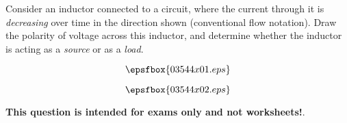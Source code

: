 

Consider an inductor connected to a circuit, where the current through it is {\it decreasing} over time in the direction shown (conventional flow notation).  Draw the polarity of voltage across this inductor, and determine whether the inductor is acting as a {\it source} or as a {\it load}.

$$\epsfbox{03544x01.eps}$$







$$\epsfbox{03544x02.eps}$$







{\bf This question is intended for exams only and not worksheets!}.



